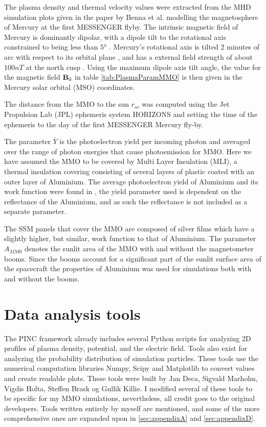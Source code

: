 The plasma density and thermal velocity values were extracted from the MHD simulation plots given in the paper by Benna et al. modelling the magnetosphere of Mercury at the first MESSENGER flyby. The intrinsic magnetic field of Mercury is dominantly dipolar, with a dipole tilt to the rotational axis constrained to being less than $\ang{5}$ \parencite{Anderson2010}. Mercury's rotational axis is tilted 2 minutes of arc with respect to its orbital plane \parencite{Rothery2015}, and has a external field strength of about $100 nT$ at the north cusp \parencite{Anderson2010}. Using the maximum dipole axis tilt angle, the value for the magnetic field $\vb{B}_0$ in table \ref{tab:PlasmaParamMMO} is then given in the Mercury solar orbital (MSO) coordinates. 

The distance from the MMO to the sun $r_{sc}$ was computed using the Jet Propulsion Lab (JPL) ephemeris system HORIZONS and setting the time of the ephemeris to the day of the first MESSENGER Mercury fly-by.

The parameter $\overline{Y}$ is the photoelectron yield per incoming photon and averaged over the range of photon energies that cause photoemission for MMO. Here we have assumed the MMO to be covered by Multi Layer Insulation (MLI), a thermal insulation covering consisting of several layers of plastic coated with an outer layer of Aluminium. The average photoelectron yield of Aluminium and its work function were found in \parencite{Feuerbacher1972}, the yield parameter used is dependent on the reflectance of the Aluminium, and as such the reflectance is not included as a separate parameter. 

The SSM panels that cover the MMO are composed of silver films which have a slightly higher, but similar, work function to that of Aluminium. The parameter $A_{MM0}$ denotes the sunlit area of the MMO with and without the magnetometer booms. Since the booms account for a significant part of the sunlit surface area of the spacecraft the properties of Aluminium was used for simulations both with and without the booms.

\section{Data analysis tools}
The PINC framework already includes several Python scripts for analyzing 2D profiles of plasma density, potential, and the electric field. Tools also exist for analyzing the probability distribution of simulation particles. These tools use the numerical computation libraries Numpy, Scipy and Matplotlib to convert values and create readable plots. These tools were built by Jan Deca, Sigvald Marholm, Vigdis Holta, Steffen Brask og Gullik Killie. I modified several of these tools to be specific for my MMO simulations, nevertheless, all credit goes to the original developers. Tools written entirely by myself are mentioned, and some of the more comprehensive ones are expanded upon in \cref{sec:appendixA} and \cref{sec:appendixD}.


\newpage

